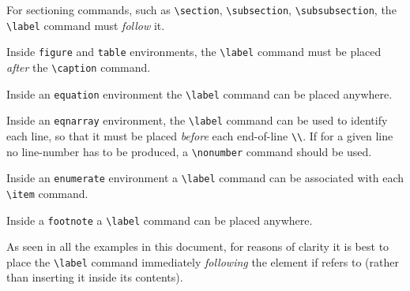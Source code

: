 \documentclass{cernphprep}
\begin{document}
\begin{Itemize}
\item For sectioning commands, such as \verb!\section!,
      \verb!\subsection!, \verb!\subsubsection!, the \verb!\label! command
      must \emph{follow} it.
\item Inside \texttt{figure} and \texttt{table} environments, the 
      \verb!\label! command must be placed \emph{after} the \verb!\caption!
      command.
\item Inside an \texttt{equation} environment the \verb!\label! command
      can be placed anywhere.
\item Inside an \texttt{eqnarray} environment, the \verb!\label! command
      can be used to identify each line, so that it must be placed
      \emph{before} each end-of-line \verb!\\!. If for a given line no
      line-number has to be produced, a \verb!\nonumber! command should
      be used.
\item Inside an \texttt{enumerate} environment a \verb!\label! command
      can be associated with each \verb!\item! command.
\item Inside a \texttt{footnote} a \verb!\label! command can be placed
      anywhere.
\end{Itemize}
As seen in all the examples in this document, for reasons of clarity
it is best to place the \verb!\label! command immediately
\emph{following} the element if refers to (rather than inserting it
inside its contents).
\end{document}
